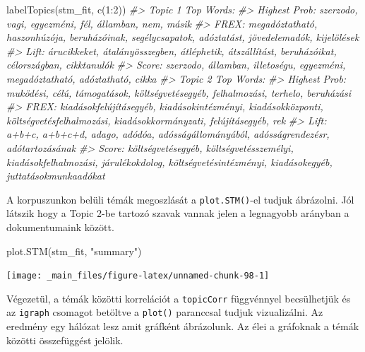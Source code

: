 \documentclass[
]{book}
\newenvironment{Shaded}{\begin{snugshade}}{\end{snugshade}}
\newcommand{\CommentTok}[1]{\textcolor[rgb]{0.56,0.35,0.01}{\textit{#1}}}
\newcommand{\DecValTok}[1]{\textcolor[rgb]{0.00,0.00,0.81}{#1}}
\newcommand{\FunctionTok}[1]{\textcolor[rgb]{0.00,0.00,0.00}{#1}}
\newcommand{\NormalTok}[1]{#1}
\newcommand{\SpecialCharTok}[1]{\textcolor[rgb]{0.00,0.00,0.00}{#1}}
\newcommand{\StringTok}[1]{\textcolor[rgb]{0.31,0.60,0.02}{#1}}
\begin{document}
\begin{Shaded}
\begin{Highlighting}[]
\FunctionTok{labelTopics}\NormalTok{(stm\_fit, }\FunctionTok{c}\NormalTok{(}\DecValTok{1}\SpecialCharTok{:}\DecValTok{2}\NormalTok{))}
\CommentTok{\#\textgreater{} Topic 1 Top Words:}
\CommentTok{\#\textgreater{}       Highest Prob: szerzodo, vagi, egyezméni, fél, államban, nem, másik }
\CommentTok{\#\textgreater{}       FREX: megadóztatható, haszonhúzója, beruházóinak, segélycsapatok, adóztatást, jövedelemadók, kijelölések }
\CommentTok{\#\textgreater{}       Lift: árucikkeket, átalányösszegben, átléphetik, átszállítást, beruházóikat, célországban, cikktanulók }
\CommentTok{\#\textgreater{}       Score: szerzodo, államban, illetoségu, egyezméni, megadóztatható, adóztatható, cikka }
\CommentTok{\#\textgreater{} Topic 2 Top Words:}
\CommentTok{\#\textgreater{}       Highest Prob: muködési, célú, támogatások, költségvetésegyéb, felhalmozási, terhelo, beruházási }
\CommentTok{\#\textgreater{}       FREX: kiadásokfelújításegyéb, kiadásokintézményi, kiadásokközponti, költségvetésfelhalmozási, kiadásokkormányzati, felújításegyéb, rek }
\CommentTok{\#\textgreater{}       Lift: a+b+c, a+b+c+d, adago, adódóa, adósságállományából, adósságrendezésr, adótartozásának }
\CommentTok{\#\textgreater{}       Score: költségvetésegyéb, költségvetésszemélyi, kiadásokfelhalmozási, járulékokdolog, költségvetésintézményi, kiadásokegyéb, juttatásokmunkaadókat}
\end{Highlighting}
\end{Shaded}

A korpuszunkon belüli témák megoszlását a \texttt{plot.STM()}-el tudjuk
ábrázolni. Jól látszik hogy a Topic 2-be tartozó szavak vannak jelen a
legnagyobb arányban a dokumentumaink között.

\begin{Shaded}
\begin{Highlighting}[]
\FunctionTok{plot.STM}\NormalTok{(stm\_fit, }\StringTok{"summary"}\NormalTok{)}
\end{Highlighting}
\end{Shaded}

\begin{center}\texttt{[image: \_main\_files/figure-latex/unnamed-chunk-98-1]} \end{center}

Végezetül, a témák közötti korrelációt a \texttt{topicCorr} függvénnyel
becsülhetjük és az \texttt{igraph} csomagot betöltve a \texttt{plot()}
paranccsal tudjuk vizualizálni. Az eredmény egy hálózat lesz amit
gráfként ábrázolunk. Az élei a gráfoknak a témák közötti összefüggést
jelölik.
\end{document}
